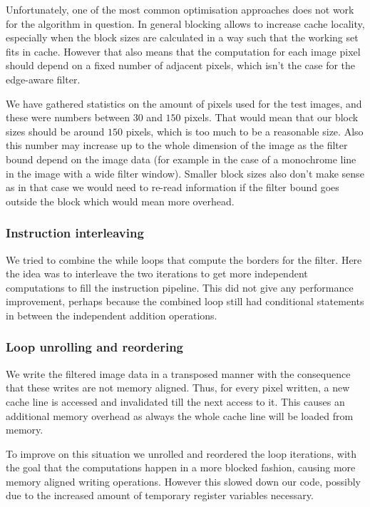 Unfortunately, one of the most common optimisation approaches does not work for the algorithm in question. In general blocking allows to increase cache locality, especially when the block sizes are calculated in a way such that the working set fits in cache. However that also means that the computation for each image pixel should depend on a fixed number of adjacent pixels, which isn't the case for the edge-aware filter.

We have gathered statistics on the amount of pixels used for the test images, and these were numbers between $30$ and $150$ pixels. That would mean that our block sizes should be around $150$ pixels, which is too much to be a reasonable size. Also this number may increase up to the whole dimension of the image as the filter bound depend on the image data (for example in the case of a monochrome line in the image with a wide filter window). Smaller block sizes also don't make sense as in that case we would need to re-read information if the filter bound goes outside the block which would mean more overhead.

\subsubsection{Instruction interleaving}

We tried to combine the while loops that compute the borders for the filter. Here the idea was to interleave the two iterations to get more independent computations to fill the instruction pipeline. This did not give any performance improvement, perhaps because the combined loop still had conditional statements in between the independent addition operations.

\subsubsection{Loop unrolling and reordering}

We write the filtered image data in a transposed manner with the consequence that these writes are not memory aligned. Thus, for every pixel written, a new cache line is accessed and invalidated till the next access to it. This causes an additional memory overhead as always the whole cache line will be loaded from memory.

To improve on this situation we unrolled and reordered the loop iterations, with the goal that the computations happen in a more blocked fashion, causing more memory aligned writing operations. However this slowed down our code, possibly due to the increased amount of temporary register variables necessary.

